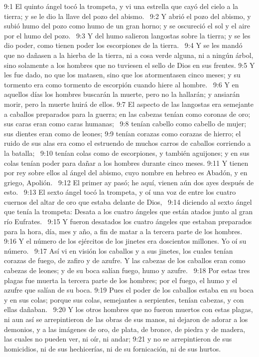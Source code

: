9:1 El quinto ángel tocó la trompeta, y vi una estrella que cayó del cielo a la tierra; y se le dio la llave del pozo del abismo.  
9:2 Y abrió el pozo del abismo, y subió humo del pozo como humo de un gran horno; y se oscureció el sol y el aire por el humo del pozo.  
9:3 Y del humo salieron langostas sobre la tierra; y se les dio poder, como tienen poder los escorpiones de la tierra.  
9:4 Y se les mandó que no dañasen a la hierba de la tierra, ni a cosa verde alguna, ni a ningún árbol, sino solamente a los hombres que no tuviesen el sello de Dios en sus frentes. 
9:5 Y les fue dado, no que los matasen, sino que los atormentasen cinco meses; y su tormento era como tormento de escorpión cuando hiere al hombre.  
9:6 Y en aquellos días los hombres buscarán la muerte, pero no la hallarán; y ansiarán morir, pero la muerte huirá de ellos. 
9:7 El aspecto de las langostas era semejante a caballos preparados para la guerra; en las cabezas tenían como coronas de oro; sus caras eran como caras humanas;  
9:8 tenían cabello como cabello de mujer; sus dientes eran como de leones; 
9:9 tenían corazas como corazas de hierro; el ruido de sus alas era como el estruendo de muchos carros de caballos corriendo a la batalla;  
9:10 tenían colas como de escorpiones, y también aguijones; y en sus colas tenían poder para dañar a los hombres durante cinco meses. 
9:11 Y tienen por rey sobre ellos al ángel del abismo, cuyo nombre en hebreo es Abadón, y en griego, Apolión.  
9:12 El primer ay pasó; he aquí, vienen aún dos ayes después de esto.  
9:13 El sexto ángel tocó la trompeta, y oí una voz de entre los cuatro cuernos del altar de oro que estaba delante de Dios,  
9:14 diciendo al sexto ángel que tenía la trompeta: Desata a los cuatro ángeles que están atados junto al gran río Eufrates.  
9:15 Y fueron desatados los cuatro ángeles que estaban preparados para la hora, día, mes y año, a fin de matar a la tercera parte de los hombres.  
9:16 Y el número de los ejércitos de los jinetes era doscientos millones. Yo oí su número.  
9:17 Así vi en visión los caballos y a sus jinetes, los cuales tenían corazas de fuego, de zafiro y de azufre. Y las cabezas de los caballos eran como cabezas de leones; y de su boca salían fuego, humo y azufre.  
9:18 Por estas tres plagas fue muerta la tercera parte de los hombres; por el fuego, el humo y el azufre que salían de su boca. 
9:19 Pues el poder de los caballos estaba en su boca y en sus colas; porque sus colas, semejantes a serpientes, tenían cabezas, y con ellas dañaban.  
9:20 Y los otros hombres que no fueron muertos con estas plagas, ni aun así se arrepintieron de las obras de sus manos, ni dejaron de adorar a los demonios, y a las imágenes de oro, de plata, de bronce, de piedra y de madera, las cuales no pueden ver, ni oír, ni andar; 
9:21 y no se arrepintieron de sus homicidios, ni de sus hechicerías, ni de su fornicación, ni de sus hurtos.  
